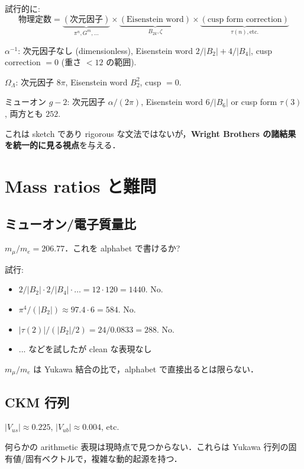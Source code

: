\documentclass[11pt,a4paper]{article}
\begin{document}
試行的に:
\begin{equation}
\text{物理定数} = \underbrace{(\text{次元因子})}_{\pi^n, G^m, \ldots}
\times \underbrace{(\text{Eisenstein word})}_{B_{2k}, \zeta}
\times \underbrace{(\text{cusp form correction})}_{\tau(n), \text{etc.}}
\end{equation}

$\alpha^{-1}$: 次元因子なし (dimensionless), Eisenstein word $2/|B_2| + 4/|B_4|$,
cusp correction $= 0$ (重さ $< 12$ の範囲).

$\Omega_\Lambda$: 次元因子 $8\pi$, Eisenstein word $B_2^2$, cusp $= 0$.

ミューオン $g-2$: 次元因子 $\alpha/(2\pi)$, Eisenstein word $6/|B_6|$ or
cusp form $\tau(3)$, 両方とも $252$.

これは sketch であり rigorous な文法ではないが，\textbf{Wright Brothers
の諸結果を統一的に見る視点}を与える．

\section{Mass ratios と難問}

\subsection{ミューオン/電子質量比}

$m_\mu/m_e = 206.77$．これを alphabet で書けるか?

試行:
\begin{itemize}
\item $2/|B_2| \cdot 2/|B_4| \cdot \ldots = 12 \cdot 120 = 1440$. No.
\item $\pi^4 / (|B_2|) \approx 97.4 \cdot 6 = 584$. No.
\item $|\tau(2)| / (|B_2| / 2) = 24 / 0.0833 = 288$. No.
\item ... などを試したが clean な表現なし
\end{itemize}

$m_\mu/m_e$ は Yukawa 結合の比で，alphabet で直接出るとは限らない．

\subsection{CKM 行列}

$|V_{us}| \approx 0.225$, $|V_{ub}| \approx 0.004$, etc.

何らかの arithmetic 表現は現時点で見つからない．これらは Yukawa
行列の固有値/固有ベクトルで，複雑な動的起源を持つ．
\end{document}
